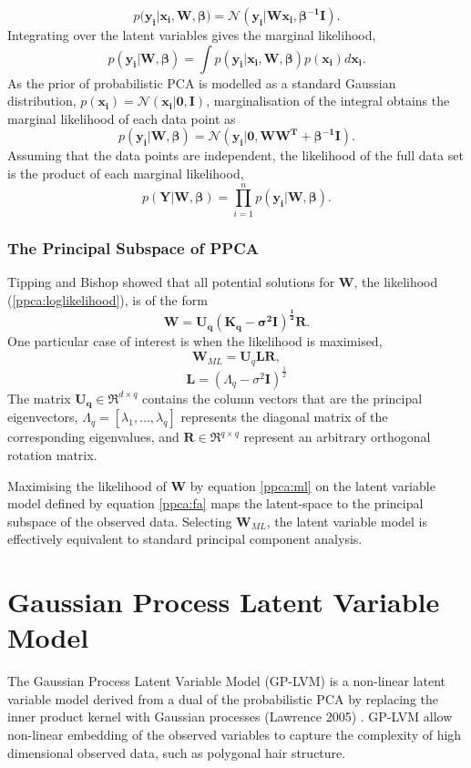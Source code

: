 \documentclass[ %
author={Dillon Keith Diep},
supervisor={Dr. Carl Henrik Ek},
degree={MEng},
title={ART-CG:},
subtitle={Assisted Real-time Content Generation of 3D Hair by Learning Manifolds},
type={Research},
year={2017} ]{dissertation}
\begin{document}
\begin{equation} \label{ppca:likelihood}
p(\bm{y_i|x_i,W,\beta)=\mathcal{N}(y_i|Wx_i,\beta^{-1}I)}.
\end{equation}
Integrating over the latent variables gives the marginal likelihood,
$$p(\bm{y_i|W,\beta})=\int p(\bm{y_i|x_i,W,\beta})p(\bm{x_i})d\bm{x_i}.$$
As the prior of probabilistic PCA is modelled as a standard Gaussian distribution, $p(\bm{x_i})=\mathcal{N}(\bm{x_i|0,I})$,
marginalisation of the integral obtains the marginal likelihood of each data point as
$$p(\bm{y_i|W,\beta})=\mathcal{N}(\bm{y_i|0,WW^T+\beta^{-1}I}).$$
Assuming that the data points are independent, the likelihood of the full data set is the product of each marginal likelihood,
$$p(\bm{Y|W,\beta})=\prod^n_{i=1} p(\bm{y_i|W,\beta}).$$

\subsubsection{The Principal Subspace of PPCA}
Tipping and Bishop showed that all potential solutions for $\bm{W}$, the likelihood (\ref{ppca:loglikelihood}), is of the form \cite{ppca} $$\bm{W=U_q(K_q-\sigma^2I)^\frac{1}{2}R}.$$
One particular case of interest is when the likelihood is maximised,
\begin{equation} \label{ppca:ml}
\bm{W}_{ML}=\bm{U}_q\bm{LR},
\end{equation}
$$\bm{L}=(\Lambda_q-\sigma^2\bm{I})^{\frac{1}{2}}$$
The matrix $\bm{U_q}\in\Re^{d \times q}$ contains the column vectors that are the principal eigenvectors, $\Lambda_q=[\lambda_1,...,\lambda_q]$ represents the diagonal matrix of the corresponding eigenvalues, and $\bm{R}\in\Re^{q \times q}$ represent an arbitrary orthogonal rotation matrix. 

Maximising the likelihood of $\bm{W}$ by equation \ref{ppca:ml} on the latent variable model defined by equation \ref{ppca:fa} maps the latent-space to the principal subspace of the observed data. Selecting $\bm{W}_{ML}$, the latent variable model is effectively equivalent to standard principal component analysis.

\section{Gaussian Process Latent Variable Model}
The Gaussian Process Latent Variable Model (GP-LVM) is a non-linear latent variable model derived from a dual of the probabilistic PCA by replacing the inner product kernel with Gaussian processes (Lawrence 2005) \cite{gplvm}. GP-LVM allow non-linear embedding of the observed variables to capture the complexity of high dimensional observed data, such as polygonal hair structure.
	
\end{document}
